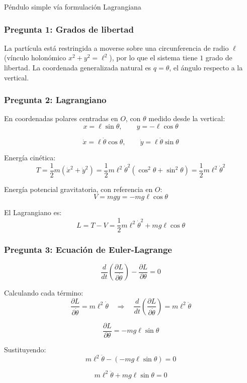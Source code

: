 \begin{solucion}{Péndulo simple vía formulación Lagrangiana}
\subsubsection*{Pregunta 1: Grados de libertad}

La partícula está restringida a moverse sobre una circunferencia de radio $\ell$ (vínculo holonómico $x^2+y^2=\ell^2$), por lo que el sistema tiene $1$ grado de libertad. La coordenada generalizada natural es $q = \theta$, el ángulo respecto a la vertical.

\subsubsection*{Pregunta 2: Lagrangiano}

En coordenadas polares centradas en $O$, con $\theta$ medido desde la vertical:
$$x = \ell\sin\theta, \qquad y = -\ell\cos\theta$$

$$\dot{x} = \ell\dot\theta\cos\theta, \qquad \dot{y} = \ell\dot\theta\sin\theta$$

Energía cinética:
$$T = \frac{1}{2}m(\dot{x}^2+\dot{y}^2) = \frac{1}{2}m\ell^2\dot\theta^2\left(\cos^2\theta+\sin^2\theta\right) = \frac{1}{2}m\ell^2\dot\theta^2$$

Energía potencial gravitatoria, con referencia en $O$:
$$V = mgy = -mg\ell\cos\theta$$

El Lagrangiano es:
$$\boxed{L = T - V = \frac{1}{2}m\ell^2\dot\theta^2 + mg\ell\cos\theta}$$

\subsubsection*{Pregunta 3: Ecuación de Euler-Lagrange}

$$\frac{d}{dt}\left(\frac{\partial L}{\partial\dot\theta}\right) - \frac{\partial L}{\partial\theta} = 0$$

Calculando cada término:
$$\frac{\partial L}{\partial\dot\theta} = m\ell^2\dot\theta \quad\Rightarrow\quad \frac{d}{dt}\left(\frac{\partial L}{\partial\dot\theta}\right) = m\ell^2\ddot\theta$$

$$\frac{\partial L}{\partial\theta} = -mg\ell\sin\theta$$

Sustituyendo:
$$m\ell^2\ddot\theta - (-mg\ell\sin\theta) = 0$$

$$m\ell^2\ddot\theta + mg\ell\sin\theta = 0$$


\end{solucion}
